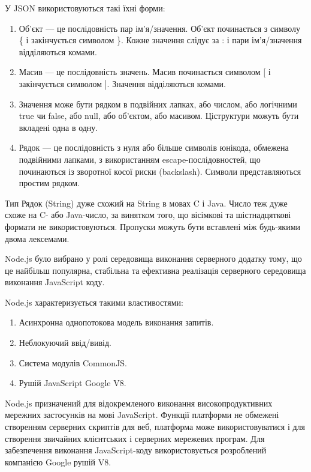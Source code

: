 \documentclass[../main.tex]{subfiles}
\begin{document}
У JSON використовуються такі їхні форми:
\begin{enumerate}
	\item Об'єкт — це послідовність пар ім'я/значення. Об'єкт починається з символу \{ і закінчується символом \}. Кожне значення слідує за : і пари ім'я/значення відділяються комами.
	\item Масив — це послідовність значень. Масив починається символом [ і закінчується символом ]. Значення відділяються комами.
	\item Значення може бути рядком в подвійних лапках, або числом, або логічними true чи false, або null, або об'єктом, або масивом. Ці\nolinebreak[3] структури можуть бути вкладені одна в одну.
	\item Рядок — це послідовність з нуля або більше символів юнікода, обмежена подвійними лапками, з використанням escape-\linebreak[0]послідовностей, що починаються із зворотної косої риски (backslash). Символи представляються простим рядком.
\end{enumerate}

Тип Рядок (String) дуже схожий на String в мовах C і Java. Число теж дуже схоже на C- або Java-число, за винятком того, що вісімкові та шістнадцяткові формати не використовуються. Пропуски можуть бути вставлені між будь-якими двома лексемами.

Node.js було вибрано у ролі середовища виконання серверного додатку тому, що це найбільш популярна, стабільна та ефективна реалізація серверного середовища виконання JavaScript коду.\pagebreak[2] %

Node.js характеризується такими властивостями:
\begin{enumerate}
	\item Асинхронна однопотокова модель виконання запитів.
	\item Неблокуючий ввід/вивід.
	\item Система модулів CommonJS.
	\item Рушій JavaScript Google V8.
\end{enumerate}

Node.js призначений для відокремленого виконання високопродуктивних мережних застосунків на мові JavaScript. Функції платформи не обмежені створенням серверних скриптів для веб, платформа може використовуватися і для створення звичайних клієнтських і серверних мережевих програм. Для забезпечення виконання JavaScript-коду використовується розроблений компанією Google рушій V8.
\end{document}
